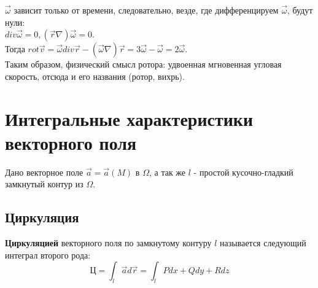 \documentclass[12pt]{article}
\begin{document}
$\overrightarrow{\omega}$ зависит только от времени, следовательно, везде, где дифференцируем $\overrightarrow{\omega}$, будут нули:\\
$div \overrightarrow{\omega} = 0, (\overrightarrow{r} \nabla) \overrightarrow{\omega} = 0$.\\
Тогда $rot \overrightarrow{v} = \overrightarrow{\omega} div \overrightarrow{r} - (\overrightarrow{\omega} \nabla)\overrightarrow{r} = 3\overrightarrow{\omega} - \overrightarrow{\omega} = 2\overrightarrow{\omega}$.\\
Таким образом, физический смысл ротора: удвоенная мгновенная угловая скорость, отсюда и его названия (ротор, вихрь).\\
\section{Интегральные характеристики векторного поля}
Дано векторное поле $\overrightarrow{a} = \overrightarrow{a}(M)$ в $\Omega$, а так же $l$ - простой кусочно-гладкий замкнутый контур из $\Omega$.\\
\subsection{Циркуляция}
\textbf{Циркуляцией} векторного поля по замкнутому контуру $l$ называется следующий интеграл второго рода:\\
$$\text{Ц} = \int_l \overrightarrow{a} d\overrightarrow{r} = \int_l Pdx + Qdy + Rdz$$
\end{document}

